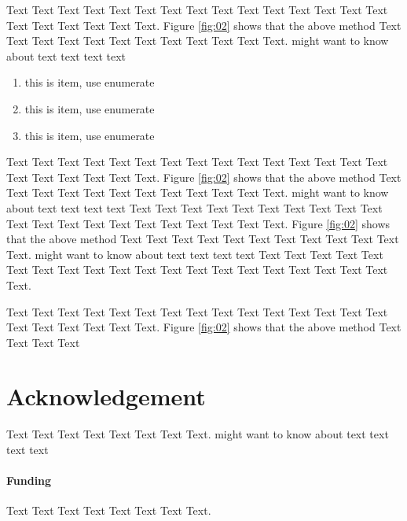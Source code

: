 \documentclass{bioinfo}
\begin{document}
Text Text Text Text Text Text  Text Text Text Text Text Text Text Text Text  Text Text Text Text Text Text. Figure \ref{fig:02} shows that the above method  Text Text Text Text  Text Text Text Text Text Text  Text Text.  \citealp{shortread} might want to know about  text text text text





\begin{enumerate}
\item this is item, use enumerate
\item this is item, use enumerate
\item this is item, use enumerate
\end{enumerate}

Text Text Text Text Text Text  Text Text Text Text Text Text Text Text Text  Text Text Text Text Text Text. Figure \ref{fig:02} shows that the above method  Text Text Text Text  Text Text Text Text Text Text  Text Text.  \citealp{shortread} might want to know about  text text text text
Text Text Text Text Text Text  Text Text Text Text Text Text Text Text Text  Text Text Text Text Text Text. Figure \ref{fig:02} shows that the above method  Text Text Text Text  Text Text Text Text Text Text  Text Text.  \citealp{shortread} might want to know about  text text text text
Text Text Text Text Text Text  Text Text Text Text Text Text Text Text Text  Text Text Text Text Text Text.






Text Text Text Text Text Text  Text Text Text Text Text Text Text Text Text  Text Text Text Text Text Text. Figure \ref{fig:02} shows that the above method  Text Text Text Text


\section*{Acknowledgement}
Text Text Text Text Text Text  Text Text.  \citealp{shortread} might want to know about  text text text text

\paragraph{Funding\textcolon} Text Text Text Text Text Text  Text Text.

%
%
%
%
%
%
%
%
%


\begin{thebibliography}{}


\end{thebibliography}
\end{document}

